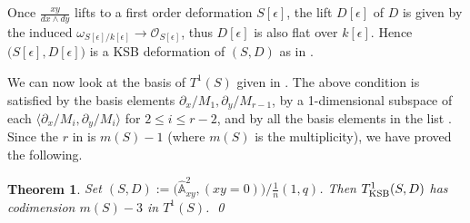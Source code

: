 \documentclass{amsart}
\newtheorem{thm}{Theorem}%
\theoremstyle{definition}
\theoremstyle{remark}
\renewcommand{\o}[0]{{\mathcal O}}
\renewcommand{\a}[0]{\hat{\mathbb A}}
\newcommand{\dx}[0]{\partial_x}
\newcommand{\dy}[0]{\partial_y}
\begin{document}
Once $\frac{xy}{dx\wedge dy} $ lifts to a first order deformation
$S[\epsilon]$, the lift $D[\epsilon]$ of $D$  is given by the induced
$\omega_{S[\epsilon]/k[\epsilon]}\to \o_{S[\epsilon]}$, thus
$D[\epsilon]$ is also flat over $k[\epsilon]$. Hence
$\bigl(S[\epsilon], D[\epsilon]\bigr)$ is a KSB deformation of $(S, D)$ as in  \cite[6.21--22]{k-modbook}.

We can now look at the basis of  $T^1(S)$ given in \cite[6.73]{k-modbook}.
The above condition is satisfied by the basis elements $\dx/M_1, \dy/M_{r-1}$,
by a 1-dimensional subspace  of each  $\bigl\langle \dx/M_i, \dy/M_i\bigr\rangle$ for $2\leq i\leq r{-}2$, and by all the basis elements in  the list  \cite[6.73.2]{k-modbook}. Since the $r$ in \cite[6.73]{k-modbook} is $m(S)-1$ (where $m(S)$ is the multiplicity), we have proved the following.


\begin{thm}\label{KSB.codin.infini.thm}
  Set $(S, D):=\bigl(\a^2_{xy}, (xy=0)\bigr)/\tfrac1{n}(1,q)$. Then $T^1_{\rm KSB}(S, D)$ has codimension $m(S)-3$ in
  $T^1(S)$. \qed
  \end{thm}
\end{document}

